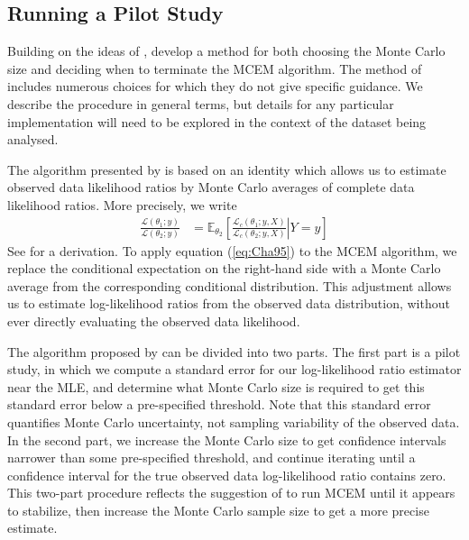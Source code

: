 \documentclass[ss]{imsart}
\theoremstyle{plain}
\theoremstyle{definition}
\theoremstyle{remark}
\newcommand{\bE}{\mathbb{E}}
\begin{document}
\subsection{Running a Pilot Study \citep{Cha95}}

Building on the ideas of \citeauthor{Wei90}, \citet{Cha95} develop a method for both choosing the Monte Carlo size and deciding when to terminate the MCEM algorithm. The method of \citeauthor{Cha95} includes numerous choices for which they do not give specific guidance. We describe the procedure in general terms, but details for any particular implementation will need to be explored in the context of the dataset being analysed. 

The algorithm presented by \citeauthor{Cha95} is based on an identity which allows us to estimate observed data likelihood ratios by Monte Carlo averages of complete data likelihood ratios. More precisely, we write
%
\begin{align}
	\frac{\mathcal{L}(\theta_1; y)}{\mathcal{L}(\theta_2; y)} &= \bE_{\theta_2} \left[ \left. \frac{\mathcal{L}_c(\theta_1; y, X)}{\mathcal{L}_c(\theta_2; y, X)} \right| Y=y \right] \label{eq:Cha95}
\end{align}
%
See \citeauthor{Cha95} for a derivation. To apply equation (\ref{eq:Cha95}) to the MCEM algorithm, we replace the conditional expectation on the right-hand side with a Monte Carlo average from the corresponding conditional distribution. This adjustment allows us to estimate log-likelihood ratios from the observed data distribution, without ever directly evaluating the observed data likelihood. 



The algorithm proposed by \citeauthor{Cha95} can be divided into two parts. The first part is a pilot study, in which we compute a standard error for our log-likelihood ratio estimator near the MLE, and determine what Monte Carlo size is required to get this standard error below a pre-specified threshold. Note that this standard error quantifies Monte Carlo uncertainty, not sampling variability of the observed data. In the second part, we increase the Monte Carlo size to get confidence intervals narrower than some pre-specified threshold, and continue iterating until a confidence interval for the true observed data log-likelihood ratio contains zero. This two-part procedure reflects the suggestion of \citet{Wei90} to run MCEM until it appears to stabilize, then increase the Monte Carlo sample size to get a more precise estimate.
\end{document}
